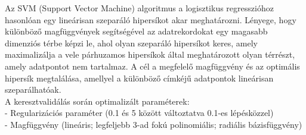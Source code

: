 \documentclass[12pt]{article}
\begin{document}
Az SVM (Support Vector Machine) algoritmus a logisztikus regresszióhoz hasonlóan egy lineárisan szeparáló hipersíkot akar meghatározni\cite{svm}. Lényege, hogy különböző magfüggvények segítségével az adatrekordokat egy magasabb dimenziós térbe képzi le, ahol olyan szeparáló hipersíkot keres, amely maximalizálja a vele párhuzamos hipersíkok által meghatározott olyan térrészt, amely adatpontot nem tartalmaz. A cél a megfelelő magfüggvény és az optimális hipersík megtalálása, amellyel a különböző címkéjű adatpontok lineárisan szeparálhatóak. \\

\noindent A keresztvalidálás során optimalizált paraméterek: \\
- Regularizációs paraméter (0.1 és 5 között változtatva 0.1-es lépésközzel)\\
- Magfüggvény (lineáris; legfeljebb 3-ad fokú polinomiális; radiális bázisfüggvény)



%
%
%
\end{document}
